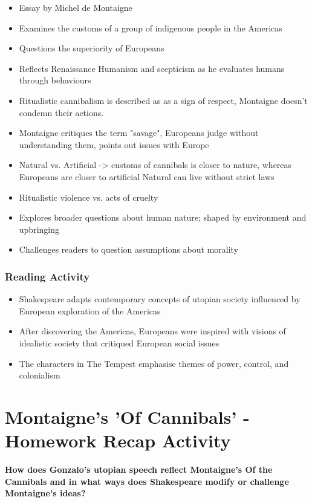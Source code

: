 			\begin{itemize}
				\item Essay by Michel de Montaigne
				\item Examines the customs of a group of indigenous people in the Americas
				\item Questions the superiority of Europeans
				\item Reflects Renaissance Humanism and scepticism as he evaluates humans through behaviours
				\item Ritualistic cannibalism is described as as a sign of respect, Montaigne doesn't condemn their actions.
				\item Montaigne critiques the term "savage", Europeans judge without understanding them, points out issues with Europe
				\item Natural vs. Artificial -> customs of cannibals is closer to nature, whereas Europeans are closer to artificial
					\subitem Natural can live without strict laws
				\item Ritualistic violence vs. acts of cruelty
				\item Explores broader questions about human nature; shaped by environment and upbringing
				\item Challenges readers to question assumptions about morality
			\end{itemize}

		\subsubsection{Reading Activity}
		
			\begin{itemize}
				\item Shakespeare adapts contemporary concepts of utopian society influenced by European exploration of the Americas
				\item After discovering the Americas, Europeans were inspired with visions of idealistic society that critiqued European social issues
				\item The characters in The Tempest emphasise themes of power, control, and colonialism
			\end{itemize}

\section{Montaigne's 'Of Cannibals' - Homework Recap Activity} \label{25/02/2025}

	\textbf{How does Gonzalo's utopian speech reflect Montaigne's Of the Cannibals and in what ways does Shakespeare modify or challenge Montaigne's ideas?}

